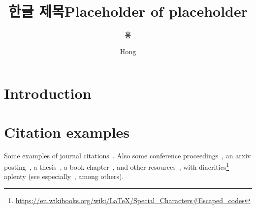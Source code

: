\documentclass[doctor,english,final]{postech-ucs}
\title[korean]{한글 제목}
\title[english]{Placeholder of placeholder}
\author[korean]{홍}{길 동}
\author[english]{Hong}{Gil Dong}
\begin{document}

    \begin{abstract}
        \lipsum[1]
    \end{abstract}

    \dedication{}

    \tableofcontents


    \listoffigures



\chapter{Introduction}
\lipsum

\chapter{Citation examples}
Some examples of journal citations~\cite{Moin1998,PhysRevD.93.124052,pimentel-etal-2020-phonotactic,jaker_kiparsky_2020,726791,Erdos1960}.  Also some conference proceedings~\cite{Erdos60onthe,NIPS1989_53c3bce6,10.5555/2969239.2969312}, an arxiv posting~\cite{li_comparing_2009}, a thesis~\cite{Gell-Mann:1951xrt}, a book chapter~\cite{LeCun2012}, and other resources~\cite{gage1994bpe}, with diacritics\footnote{\url{https://en.wikibooks.org/wiki/LaTeX/Special_Characters\#Escaped_codes}} aplenty (see especially~\cite{jaker_kiparsky_2020,726791,Erdos1960}, among others).

\begin{summarykorean}
\jiwon
\end{summarykorean}
\end{document}
